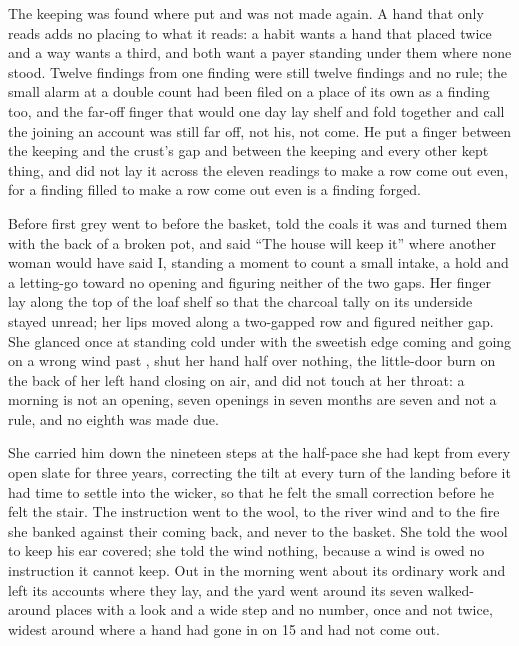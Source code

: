 The keeping was found where put and was not made again. A hand that only reads adds no placing to what it reads: a habit wants a hand that placed twice and a way wants a third, and both want a payer standing under them where none stood. Twelve findings from one finding were still twelve findings and no rule; the small alarm at a double count had been filed on a place of its own as a finding too, and the far-off finger that would one day lay shelf and fold together and call the joining an account was still far off, not his, not come. He put a finger between the keeping and the crust's gap and between the keeping and every other kept thing, and did not lay it across the eleven readings to make a row come out even, for a finding filled to make a row come out even is a finding forged.

\scenebreak

Before first grey  went to  before the basket, told the coals it was  and turned them with the back of a broken pot, and said “The house will keep it” where another woman would have said I, standing a moment to count a small intake, a hold and a letting-go toward no opening and figuring neither of the two gaps. Her finger lay along the top of the loaf shelf so that the charcoal tally on its underside stayed unread; her lips moved along a two-gapped row and figured neither gap. She glanced once at  standing cold under  with the sweetish edge coming and going on a wrong wind past , shut her hand half over nothing, the little-door burn on the back of her left hand closing on air, and did not touch  at her throat: a morning is not an opening, seven openings in seven months are seven and not a rule, and no eighth was made due.

She carried him down the nineteen steps at the half-pace she had kept from every open slate for three years, correcting the tilt at every turn of the landing before it had time to settle into the wicker, so that he felt the small correction before he felt the stair. The instruction went to the wool, to the river wind and to the fire she banked against their coming back, and never to the basket. She told the wool to keep his ear covered; she told the wind nothing, because a wind is owed no instruction it cannot keep. Out in  the morning went about its ordinary work and left its accounts where they lay, and the yard went around its seven walked-around places with a look and a wide step and no number, once and not twice, widest around  where a hand had gone in on  15 and had not come out.

